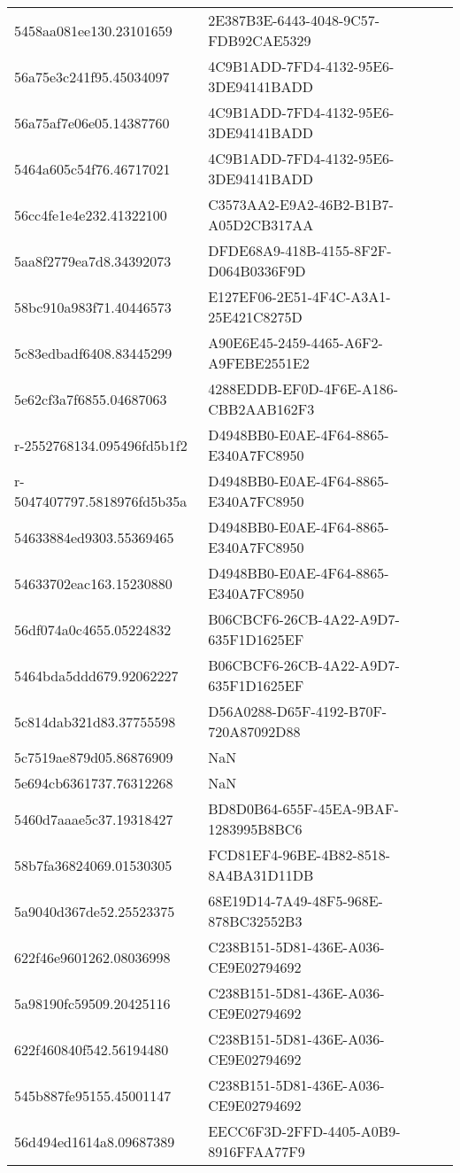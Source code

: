 \begin{tabular}{ll}
5458aa081ee130.23101659 & 2E387B3E-6443-4048-9C57-FDB92CAE5329 \\
56a75e3c241f95.45034097 & 4C9B1ADD-7FD4-4132-95E6-3DE94141BADD \\
56a75af7e06e05.14387760 & 4C9B1ADD-7FD4-4132-95E6-3DE94141BADD \\
5464a605c54f76.46717021 & 4C9B1ADD-7FD4-4132-95E6-3DE94141BADD \\
56cc4fe1e4e232.41322100 & C3573AA2-E9A2-46B2-B1B7-A05D2CB317AA \\
5aa8f2779ea7d8.34392073 & DFDE68A9-418B-4155-8F2F-D064B0336F9D \\
58bc910a983f71.40446573 & E127EF06-2E51-4F4C-A3A1-25E421C8275D \\
5c83edbadf6408.83445299 & A90E6E45-2459-4465-A6F2-A9FEBE2551E2 \\
5e62cf3a7f6855.04687063 & 4288EDDB-EF0D-4F6E-A186-CBB2AAB162F3 \\
r-2552768134.095496fd5b1f2 & D4948BB0-E0AE-4F64-8865-E340A7FC8950 \\
r-5047407797.5818976fd5b35a & D4948BB0-E0AE-4F64-8865-E340A7FC8950 \\
54633884ed9303.55369465 & D4948BB0-E0AE-4F64-8865-E340A7FC8950 \\
54633702eac163.15230880 & D4948BB0-E0AE-4F64-8865-E340A7FC8950 \\
56df074a0c4655.05224832 & B06CBCF6-26CB-4A22-A9D7-635F1D1625EF \\
5464bda5ddd679.92062227 & B06CBCF6-26CB-4A22-A9D7-635F1D1625EF \\
5c814dab321d83.37755598 & D56A0288-D65F-4192-B70F-720A87092D88 \\
5c7519ae879d05.86876909 & NaN \\
5e694cb6361737.76312268 & NaN \\
5460d7aaae5c37.19318427 & BD8D0B64-655F-45EA-9BAF-1283995B8BC6 \\
58b7fa36824069.01530305 & FCD81EF4-96BE-4B82-8518-8A4BA31D11DB \\
5a9040d367de52.25523375 & 68E19D14-7A49-48F5-968E-878BC32552B3 \\
622f46e9601262.08036998 & C238B151-5D81-436E-A036-CE9E02794692 \\
5a98190fc59509.20425116 & C238B151-5D81-436E-A036-CE9E02794692 \\
622f460840f542.56194480 & C238B151-5D81-436E-A036-CE9E02794692 \\
545b887fe95155.45001147 & C238B151-5D81-436E-A036-CE9E02794692 \\
56d494ed1614a8.09687389 & EECC6F3D-2FFD-4405-A0B9-8916FFAA77F9 \\

\end{tabular}
